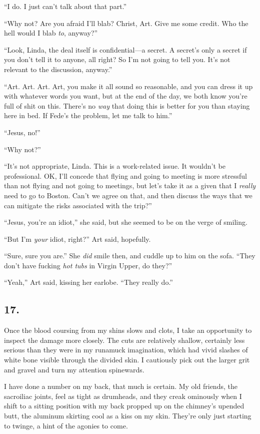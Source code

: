 “I do. I just can’t talk about that part.”

“Why not? Are you afraid I’ll blab? Christ, Art. Give me some
credit. Who the hell would I blab \emph{to}, anyway?”

“Look, Linda, the deal itself is confidential—a secret. A secret’s
only a secret if you don’t tell it to anyone, all right? So I’m not
going to tell you. It’s not relevant to the discussion, anyway.”

“Art. Art. Art. Art, you make it all sound so reasonable, and you
can dress it up with whatever words you want, but at the end of the
day, we both know you’re full of shit on this. There’s no
\emph{way} that doing this is better for you than staying here in
bed. If Fede’s the problem, let me talk to him.”

“Jesus, no!”

“Why not?”

“It’s not appropriate, Linda. This is a work-related issue. It
wouldn’t be professional. OK, I’ll concede that flying and going to
meeting is more stressful than not flying and not going to
meetings, but let’s take it as a given that I \emph{really} need to
go to Boston. Can’t we agree on that, and then discuss the ways
that we can mitigate the risks associated with the trip?”

“Jesus, you’re an idiot,” she said, but she seemed to be on the
verge of smiling.

“But I’m \emph{your} idiot, right?” Art said, hopefully.

“Sure, sure you are.” She \emph{did} smile then, and cuddle up to
him on the sofa. “They don’t have fucking \emph{hot tubs} in Virgin
Upper, do they?”

“Yeah,” Art said, kissing her earlobe. “They really do.”

\subsection{17.}

Once the blood coursing from my shins slows and clots, I take an
opportunity to inspect the damage more closely. The cuts are
relatively shallow, certainly less serious than they were in my
runamuck imagination, which had vivid slashes of white bone visible
through the divided skin. I cautiously pick out the larger grit and
gravel and turn my attention spinewards.

I have done a number on my back, that much is certain. My old
friends, the sacroiliac joints, feel as tight as drumheads, and
they creak ominously when I shift to a sitting position with my
back propped up on the chimney’s upended butt, the aluminum
skirting cool as a kiss on my skin. They’re only just starting to
twinge, a hint of the agonies to come.


